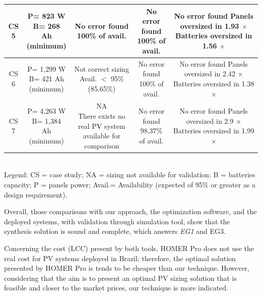 \documentclass[10pt,journal,compsoc]{IEEEtran}
\begin{document}
\begin{table}
\begin{scriptsize}
\begin{tabular}{c|c|c|c|c}
\hline
CS 5 & \makecell{P= 823 W\\B= 268 Ah\\(minimum)} & \makecell{No error found \\100\% of avail.} & \makecell{No error found \\100\% of avail.} & \makecell{No error found\\Panels oversized in 1.93 $\times$\\Batteries oversized in 1.56 $\times$}\\
\hline
CS 6 & \makecell{P= 1,299 W\\B= 421 Ah\\(minimum)} & \makecell{Not correct sizing \\Avail. $<$ 95\%\\(85.65\%)} & \makecell{No error found \\100\% of avail.} & \makecell{No error found\\Panels oversized in 2.42 $\times$\\Batteries oversized in 1.38 $\times$}\\
\hline
CS 7 & \makecell{P= 4,263 W\\B= 1,384 Ah\\(minimum)} & \makecell{NA\\There exists no real PV system\\available for comparison} & \makecell{No error found \\98.37\% of avail.} & \makecell{No error found\\Panels oversized in 2.9 $\times$\\Batteries oversized in 1.99 $\times$}\\
\hline
\hline
\end{tabular}
\\Legend: CS = case study; NA = sizing not available for validation; B = batteries capacity; P = panels power; Avail.= Availability (expected of 95\% or greater as a design requirement).
\end{scriptsize}
\end{table}

Overall, those comparisons with our approach, the optimization software, and the deployed systems, with validation through simulation tool, show that the synthesis solution is sound and complete, which answers \textit{EG1} and {EG3}.

\color{blue}Concerning the cost (LCC) present by both tools, HOMER Pro does not use the real cost for PV systems deployed in Brazil; therefore, the optimal solution presented by HOMER Pro is tends to be cheaper than our technique. However, considering that the aim is to present an optimal PV sizing solution that is feasible and closer to the market prices, our technique is more indicated. \color{black}
\end{document}
